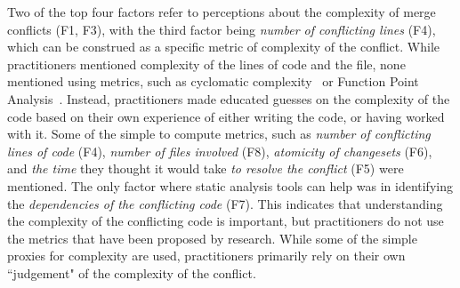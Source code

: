
\label{artifact-based-factors}
Two of the top four factors refer to perceptions about the complexity of merge conflicts (F1, F3), with the third factor being \textit{number of conflicting lines} (F4), which can be construed as a specific metric of complexity of the conflict. 
While practitioners mentioned complexity of the lines of code and the file, none mentioned using metrics, such as cyclomatic complexity~\cite{fenton2000quantitative}\cite{mccabe1976complexity} or Function Point Analysis~\cite{garmus2001fpa}\cite{symons1988function}. 
Instead, practitioners made educated guesses on the complexity of the code based on their own experience of either writing the code, or having worked with it. 
Some of the simple to compute metrics, such as \textit{number of conflicting lines of code} (F4), \textit{number of files involved} (F8), \textit{atomicity of changesets} (F6), and \textit{the time} they thought it would take \textit{to resolve the conflict} (F5) were mentioned. 
The only factor where static analysis tools can help was in identifying the \textit{dependencies of the conflicting code} (F7).
This indicates that understanding the complexity of the conflicting code is important, but practitioners do not use the metrics that have been proposed by research. While some of the simple proxies for complexity are used, practitioners primarily rely on their own ``judgement" of the complexity of the conflict.



